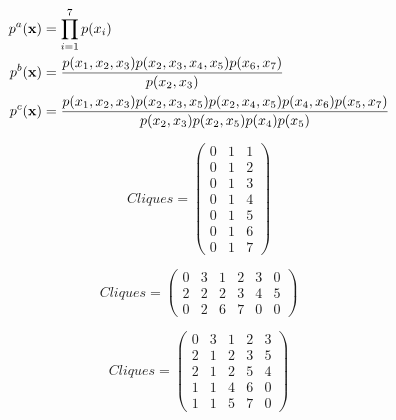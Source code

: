 \documentclass[a4paper]{article}
\begin{document}
\begin{example}
\begin{align}
p^a({\bf{x}}) &=  \prod_{i=1}^7 p(x_i) \label{eq:fact-a}\\
p^b({\bf{x}}) &= \frac{p(x_1,x_2,x_3) p(x_2,x_3,x_4,x_5)
  p(x_6,x_7)}{p(x_2,x_3)} \label{eq:fact-b}\\
p^c({\bf{x}}) &= \frac{p(x_1,x_2,x_3) p(x_2,x_3,x_5)
  p(x_2,x_4,x_5)p(x_4,x_6) p(x_5,x_7) }{p(x_2,x_3)p(x_2,x_5)p(x_4)p(x_5)} \label{eq:fact-c}
\end{align}



\begin{equation}
 Cliques = \left (\begin{array}{ccc}
           0  & 1 & 1 \\
           0  & 1 & 2 \\
           0  & 1 & 3 \\
           0  & 1 & 4 \\
           0  & 1 & 5 \\
           0  & 1 & 6 \\
           0  & 1 & 7
          \end{array}  \right ) \label{eq:CLIQ_a}
\end{equation}


\begin{equation}
             Cliques =  \left (\begin{array}{cccccc}
             0 & 3 & 1 & 2 & 3 & 0 \\
             2 & 2 & 2 & 3 & 4 & 5 \\
             0 & 2 & 6 & 7 & 0 & 0
           \end{array}  \right )\label{eq:CLIQ_b}
 \end{equation}



 \begin{equation}
Cliques =  \left (\begin{array}{ccccc}
             0 & 3 & 1 & 2 & 3 \\
             2 & 1 & 2 & 3 & 5 \\
             2 & 1 & 2 & 5 & 4 \\
             1 & 1 & 4 & 6 & 0 \\
             1 & 1 & 5 & 7 & 0
           \end{array} \right )\label{eq:CLIQ_c}
 \end{equation}


 \label{ex:MODEL} \end{example}
\end{document}
